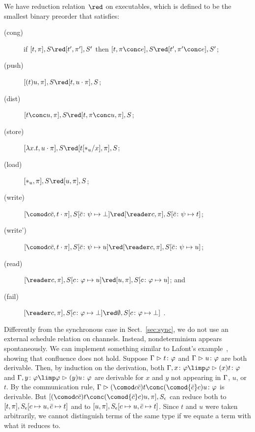 We have reduction relation~$\red$ on executables,
which is defined to be the smallest binary preorder
that satisfies:
\begin{description}
 \item[(cong)] if
	    $[t,\pi],         S \red [ t',\pi'],        S'$
	    then
	    $[t,\pi \conc e], S \red [ t',\pi'\conc e], S'$\enspace;
 \item[(push)]
	    $[(t)u,\pi],S       \red [t,u\cdot\pi],S$;
 \item[(dist)]
	    $[t\conc u,\pi],S   \red [t,\pi\conc u,\pi],S$\enspace;
 \item[(store)]
	    $[\lambda x.t,u\cdot\pi],S
	     \red
	     [t[\ast_u/x],      \pi],S$\enspace;
 \item[(load)]
	    $[\ast_u,\pi],S\red[u,\pi],S$\enspace;
 \item[(write)]
	    $
	    [\comod c{\co c}, t\cdot\pi], S[\co
	    c\colon\psi\mapsto\bot]
	    \red
	    [\reader c, \pi],
	    S[\co c\colon\psi\mapsto t]
	    $\enspace;
 \item[(write')]
	    $
	    [\comod c{\co c}, t\cdot\pi], S[\co
	    c\colon\psi\mapsto u]
	    \red
	    [\reader c, \pi],
	    S[\co c\colon\psi\mapsto u]
	    $\enspace;
 \item[(read)]$
	    [\reader c ,\pi],
	    S[c\colon\phi\mapsto u]
	    \red
	    [u,\pi],
	    S[c\colon\phi\mapsto u]
	    $\enspace; and
 \item[(fail)]
	    $
	    [\reader c,\pi],
	    S[c\colon\phi\mapsto \bot]
	    \red
	    \emptyset,S[c\colon\phi\mapsto \bot]
	    $
	    \enspace.
\end{description}
Differently from the synchronous case in Sect.~\ref{sec:sync},
we do not use an external schedule relation on channels.
Instead, nondeterminism appears spontaneously.
We can implement something similar to Lafont's example~,
showing that confluence does not hold.
Suppose $\Gamma\vartriangleright{t} \colon{\varphi}$ and $\Gamma\vartriangleright{u} \colon{\varphi}$ are both derivable.
Then, by induction on the derivation,
both $\G,\tj x{\phi\limp\phi}\tr\tj{(x)t}\phi$
and $\G,\tj y{\phi\limp\phi}\tr\tj{(y)u}\phi$ are derivable
for $x$ and $y$ not appearing in $\Gamma$, $u$, or $t$.
By the communication rule,
$\G\tr\tj{(\comod c{\co c})t\conc(\comod {\co c} c)u}\phi$ is derivable.
But $[(\comod c{\co c})t\conc (\comod{\co c} c)u,
\pi],S_\epsilon$
can reduce both to $[t,\pi], S_\epsilon[c\mapsto u, \bar{c}\mapsto t]$
and to $[u,\pi], S_\epsilon[c\mapsto u,\bar{c}\mapsto t]$.
Since $t$ and $u$ were taken arbitrarily, we cannot distinguish terms
of the same type if we equate a term with what it reduces to.

